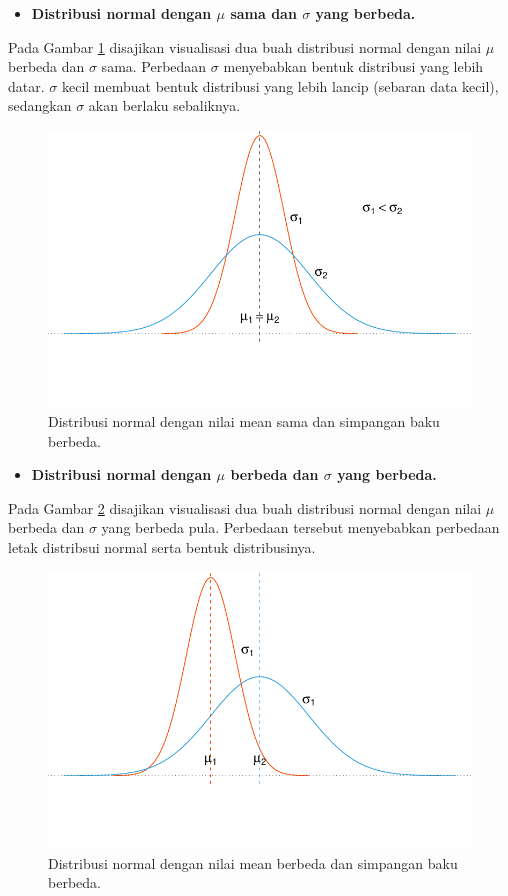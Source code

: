 \documentclass[]{book}
\providecommand{\tightlist}{%
  \setlength{\itemsep}{0pt}\setlength{\parskip}{0pt}}
\begin{document}
\begin{itemize}
\tightlist
\item
  \textbf{Distribusi normal dengan \(\mu\) sama dan \(\sigma\) yang
  berbeda.}
\end{itemize}

Pada Gambar \ref{fig:normvis2} disajikan visualisasi dua buah distribusi
normal dengan nilai \(\mu\) berbeda dan \(\sigma\) sama. Perbedaan
\(\sigma\) menyebabkan bentuk distribusi yang lebih datar. \(\sigma\)
kecil membuat bentuk distribusi yang lebih lancip (sebaran data kecil),
sedangkan \(\sigma\) akan berlaku sebaliknya.

\begin{figure}

{\centering \includegraphics[width=0.7\linewidth]{EnvStat_files/figure-latex/normvis2-1} 

}

\caption{Distribusi normal dengan nilai mean sama dan simpangan baku berbeda.}\label{fig:normvis2}
\end{figure}

\begin{itemize}
\tightlist
\item
  \textbf{Distribusi normal dengan \(\mu\) berbeda dan \(\sigma\) yang
  berbeda.}
\end{itemize}

Pada Gambar \ref{fig:normvis3} disajikan visualisasi dua buah distribusi
normal dengan nilai \(\mu\) berbeda dan \(\sigma\) yang berbeda pula.
Perbedaan tersebut menyebabkan perbedaan letak distribsui normal serta
bentuk distribusinya.

\begin{figure}

{\centering \includegraphics[width=0.7\linewidth]{EnvStat_files/figure-latex/normvis3-1} 

}

\caption{Distribusi normal dengan nilai mean berbeda dan simpangan baku berbeda.}\label{fig:normvis3}
\end{figure}
\end{document}
